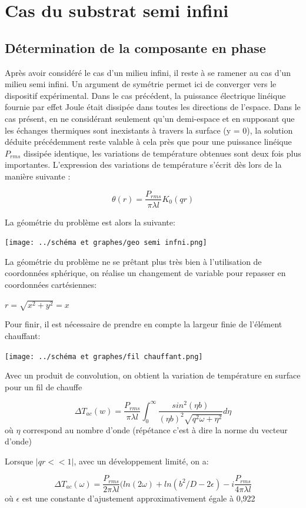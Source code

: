 \documentclass[10pt,a4paper]{report}
\begin{document}
\section{Cas du substrat semi infini}
\subsection{Détermination de la composante en phase}
Après avoir considéré le cas d’un milieu infini, il reste à se ramener au cas d'un milieu semi infini.
Un argument de symétrie permet ici de converger vers le dispositif expérimental. Dans le cas précédent, la puissance électrique linéique fournie par effet Joule était dissipée dans toutes les directions de l'espace. Dans le cas présent, en ne considérant seulement qu'un demi-espace et en supposant que les échanges thermiques sont inexistants à travers la surface (y = 0), la solution déduite précédemment reste valable à cela près que pour une puissance linéique $P_{rms}$ dissipée identique, les variations de température obtenues sont deux fois plus importantes. L'expression des variations de température s'écrit dès lors de la manière suivante :
\begin{center}
\begin{equation}
\theta(r)=\frac{P_{rms}}{\pi\lambda l}K_{0}(qr)
\end{equation}
\end{center}
La géométrie du problème est alors la suivante:
\begin{center}
\texttt{[image: ../schéma et graphes/geo semi infni.png]} 
\label{fig3}
\end{center}
La géométrie du problème ne se prêtant plus très bien à l’utilisation de coordonnées sphérique, on réalise un changement de variable pour repasser en coordonnées cartésiennes:
\begin{center}
$r=\sqrt{x^2+y^2}=x$
\end{center}
Pour finir, il est nécessaire de prendre en compte la largeur finie de l'élément chauffant:
\begin{center}
\texttt{[image: ../schéma et graphes/fil chauffant.png]} 
\label{fig4} 
\end{center}
Avec un produit de convolution, on obtient la variation de température en surface pour un fil de chauffe
\begin{center}
\begin{equation}
\Delta T_{ac}(w)=\frac{P_{rms}}{\pi\lambda l}\int_{0}^\infty \frac{sin^2(\eta b)}{(\eta b)^2\sqrt{q^2\omega+\eta^2}}d\eta
\end{equation}
où $\eta$ correspond au nombre d'onde (répétance c'est à dire la norme du vecteur d'onde)
\end{center}
Lorsque $\lvert qr<<1 \rvert$, avec un développement limité, on a:
\begin{center}
\begin{equation}
\Delta T_{ac}(\omega)=\frac{P_{rms}}{2\pi\lambda l}(ln(2\omega)+ln(b^2/D-2\epsilon)-i\frac{P_{rms}}{4\pi\lambda l}
\end{equation}
où $\epsilon$ est une constante d'ajustement approximativement égale à 0,922
\end{center}
\end{document}
